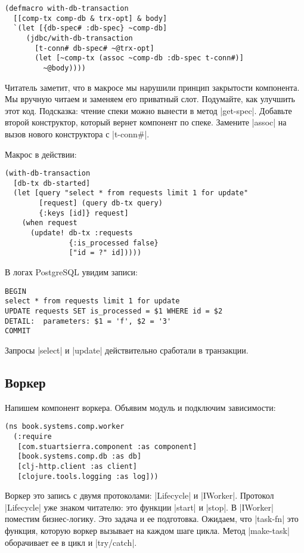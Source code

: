 \begin{verbatim}
(defmacro with-db-transaction
  [[comp-tx comp-db & trx-opt] & body]
  `(let [{db-spec# :db-spec} ~comp-db]
     (jdbc/with-db-transaction
       [t-conn# db-spec# ~@trx-opt]
       (let [~comp-tx (assoc ~comp-db :db-spec t-conn#)]
         ~@body))))
\end{verbatim}

Читатель заметит, что в макросе мы нарушили принцип закрытости компонента. Мы
вручную читаем и заменяем его приватный слот. Подумайте, как улучшить этот
код. Подсказка: чтение спеки можно вынести в метод \spverb|get-spec|. Добавьте
второй конструктор, который вернет компонент по спеке. Замените \spverb|assoc|
на вызов нового конструктора с \spverb|t-conn#|.

Макрос в действии:

\begin{verbatim}
(with-db-transaction
  [db-tx db-started]
  (let [query "select * from requests limit 1 for update"
        [request] (query db-tx query)
        {:keys [id]} request]
    (when request
      (update! db-tx :requests
               {:is_processed false}
               ["id = ?" id]))))
\end{verbatim}

В логах PostgreSQL увидим записи:

\begin{verbatim}
BEGIN
select * from requests limit 1 for update
UPDATE requests SET is_processed = $1 WHERE id = $2
DETAIL:  parameters: $1 = 'f', $2 = '3'
COMMIT
\end{verbatim}

Запросы \spverb|select| и \spverb|update| действительно сработали в транзакции.

\subsection{Воркер}

Напишем компонент воркера. Объявим модуль и подключим зависимости:

\begin{verbatim}
(ns book.systems.comp.worker
  (:require
   [com.stuartsierra.component :as component]
   [book.systems.comp.db :as db]
   [clj-http.client :as client]
   [clojure.tools.logging :as log]))
\end{verbatim}

Воркер это запись с двумя протоколами: \spverb|Lifecycle| и
\spverb|IWorker|. Протокол \spverb|Lifecycle| уже знаком читателю: это функции
\spverb|start| и \spverb|stop|. В \spverb|IWorker| поместим бизнес-логику. Это
задача и ее подготовка. Ожидаем, что \spverb|task-fn| это функция, которую
воркер вызывает на каждом шаге цикла. Метод \spverb|make-task| оборачивает ее в
цикл и \spverb|try/catch|.

